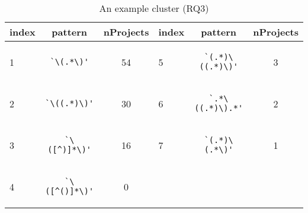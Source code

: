 
\begin{table}
\begin{center}
\caption{An example cluster (RQ3)}
\label{table:exampleCluster}
\begin{small}
\begin{tabular}
{lcc | lcc}
\toprule
index & pattern & nProjects & index & pattern & nProjects \\
\midrule
1 & \begin{minipage}{0.3in}\begin{verbatim}`\(.*\)'\end{verbatim}\end{minipage} & 54  & 5 & \begin{minipage}{0.5in}\begin{verbatim}`(.*)\((.*)\)'\end{verbatim}\end{minipage} & 3 \\
\midrule
2 & \begin{minipage}{0.3in}\begin{verbatim}`\((.*)\)'\end{verbatim}\end{minipage} & 30 & 6 & \begin{minipage}{0.6in}\begin{verbatim}`.*\((.*)\).*'\end{verbatim}\end{minipage} & 2 \\
\midrule
3 & \begin{minipage}{0.3in}\begin{verbatim}`\([^)]*\)'\end{verbatim}\end{minipage} & 16 & 7 & \begin{minipage}{0.5in}\begin{verbatim}`(.*)\(.*\)'\end{verbatim}\end{minipage} & 1 \\
\midrule
4 & \begin{minipage}{0.3in}\begin{verbatim}`\([^()]*\)'\end{verbatim}\end{minipage} & 0 &&&\\

\bottomrule
\end{tabular}
\end{small}
\end{center}
\end{table}


